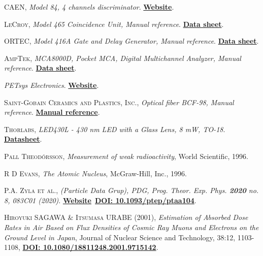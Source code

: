 \begin{thebibliography}{100}
 \textsc{CAEN},
\textit{Model 84, 4 channels discriminator}. \href{https://www.caen.it/}{\textbf{Website}}.

 \textsc{LeCroy},
\textit{Model 465 Coincidence Unit, Manual reference}. \href{https://prep.fnal.gov/catalog/hardware_info/lecroy/nim/465.html}{\textbf{Data sheet}}.

 \textsc{ORTEC},
\textit{Model 416A Gate and Delay Generator, Manual reference}. \href{https://www.ortec-online.com/products/electronics/delays-gates-and-logic-modules/416a}{\textbf{Data sheet}}.

 \textsc{AmpTek},
\textit{MCA8000D, Pocket MCA, Digital Multichannel Analyzer, Manual reference}. \href{https://www.amptek.com/products/multichannel-analyzers/mca-8000d-digital-multichannel-analyzer}{\textbf{Data sheet}}.

 \textit{PETsys Electronics}. \href{https://www.petsyselectronics.com/web/private/login}{\textbf{Website}}.

 \textsc{Saint-Gobain Ceramics and Plastics, Inc.},
\textit{Optical fiber BCF-98, Manual reference}. \href{https://www.crystals.saint-gobain.com/products/scintillating-fiber}{\textbf{Manual reference}}.

 \textsc{Thorlabs},
\textit{LED430L - 430 nm LED with a Glass Lens, 8 mW, TO-18}. \href{https://www.thorlabs.com/thorproduct.cfm?partnumber=LED430L}{\textbf{Datasheet}}.

 \textsc{Pall Theodórsson},
\textit{Measurement of weak radioactivity}, World Scientific, 1996.

 \textsc{R D Evans},
\textit{The Atomic Nucleus}, McGraw-Hill, Inc., 1996.

 \textsc{P.A. Zyla et al.},
\textit{(Particle Data Grup), PDG, Prog. Theor. Exp. Phys. \textbf{2020} no. 8, 083C01 (2020)}. \href{https://pdg.lbl.gov/}{\textbf{Website}}~\href{https://academic.oup.com/ptep/article/2020/8/083C01/5891211}{\textbf{DOI: 10.1093/ptep/ptaa104}}.

 \textsc{Hiroyuki SAGAWA \& Itsumasa URABE (2001)},
\textit{Estimation of Absorbed Dose Rates in Air Based on Flux Densities of Cosmic Ray Muons and Electrons on the Ground Level in Japan}, Journal of Nuclear Science and Technology, 38:12, 1103-1108, \href{https://doi.org/10.1080/18811248.2001.9715142}{\textbf{DOI: 10.1080/18811248.2001.9715142}}.


\end{thebibliography}
